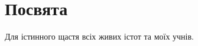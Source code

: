 \begin{figure}[ht!]
\section*{Посвята}
Для істинного щастя всіх живих істот та моїх учнів.
\\
\\
\\

\end{figure}
